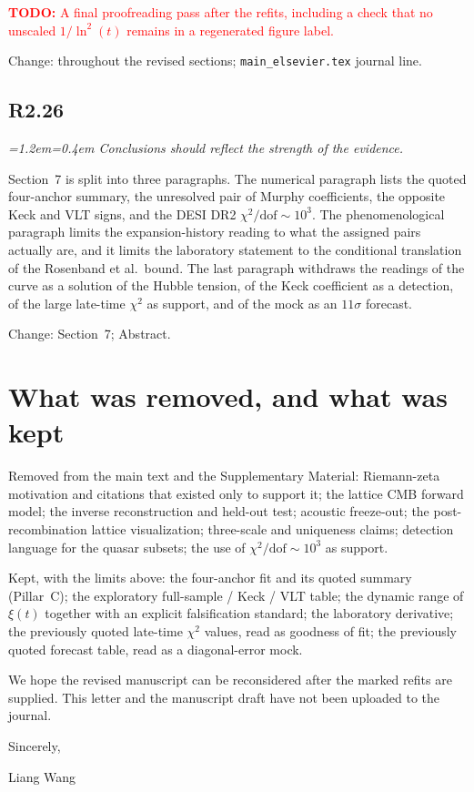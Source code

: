 \documentclass[11pt,a4paper]{article}
\newenvironment{review}{\par\color{revcolor}\itshape\leftskip=1.2em\rightskip=0.4em\noindent}{\par\leftskip=0pt\rightskip=0pt}
\newcommand{\revtodo}[1]{\textcolor{red}{\textbf{TODO:} #1}}
\begin{document}
\revtodo{A final proofreading pass after the refits, including a check that no unscaled $1/\ln^2(t)$ remains in a regenerated figure label.}

Change: throughout the revised sections; \texttt{main\_elsevier.tex} journal line.

\subsection*{R2.26}
\begin{review}
Conclusions should reflect the strength of the evidence.
\end{review}

Section~7 is split into three paragraphs.
The numerical paragraph lists the quoted four-anchor summary, the unresolved pair of Murphy coefficients, the opposite Keck and VLT signs, and the DESI DR2 $\chi^2/\mathrm{dof}\sim 10^{3}$.
The phenomenological paragraph limits the expansion-history reading to what the assigned pairs actually are, and it limits the laboratory statement to the conditional translation of the Rosenband et al.\ bound.
The last paragraph withdraws the readings of the curve as a solution of the Hubble tension, of the Keck coefficient as a detection, of the large late-time $\chi^2$ as support, and of the mock as an $11\sigma$ forecast.

Change: Section~7; Abstract.

\section*{What was removed, and what was kept}

Removed from the main text and the Supplementary Material: Riemann-zeta motivation and citations that existed only to support it; the lattice CMB forward model; the inverse reconstruction and held-out test; acoustic freeze-out; the post-recombination lattice visualization; three-scale and uniqueness claims; detection language for the quasar subsets; the use of $\chi^2/\mathrm{dof}\sim 10^{3}$ as support.

Kept, with the limits above: the four-anchor fit and its quoted summary (Pillar~C); the exploratory full-sample / Keck / VLT table; the dynamic range of $\xi(t)$ together with an explicit falsification standard; the laboratory derivative; the previously quoted late-time $\chi^2$ values, read as goodness of fit; the previously quoted forecast table, read as a diagonal-error mock.

We hope the revised manuscript can be reconsidered after the marked refits are supplied.
This letter and the manuscript draft have not been uploaded to the journal.

Sincerely,

Liang Wang
\end{document}
